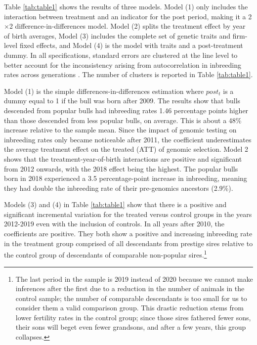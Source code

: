 \documentclass[12pt,letterpaper]{article}
\begin{document}


Table \ref{tab:table1} shows the results of three models.  Model (1) only includes the interaction between treatment and an indicator for the post period, making it a 2$\times$2 difference-in-differences model. Model (2) splits the treatment effect by year of birth averages, Model (3) includes the complete set of genetic traits and firm-level fixed effects, and Model (4) is the model with traits and a post-treatment dummy. In all specifications, standard errors are clustered at the line level to better account for the inconsistency arising from autocorrelation in inbreeding rates across generations \citep{Bertrand2004}. The number of clusters is reported in Table \ref{tab:table1}. 

Model (1) is the simple differences-in-differences estimation where $post_{t}$ is a dummy equal to 1 if the bull was born after 2009. The results show that bulls descended from popular bulls had inbreeding rates 1.46 percentage points higher than those descended from less popular bulls, on average. This is about a 48\% increase relative to the sample mean. Since the impact of genomic testing on inbreeding rates only became noticeable after 2011, the coefficient underestimates the average treatment effect on the treated (ATT) of genomic selection. Model 2 shows that the treatment-year-of-birth interactions are positive and significant from 2012 onwards, with the 2018 effect being the highest.
The popular bulls born in 2018 experienced a 3.5 percentage-point increase in inbreeding, meaning they had double the inbreeding rate of their pre-genomics ancestors (2.9\%).

Models (3) and (4) in Table \ref{tab:table1} show that there is a positive and significant incremental variation for the treated versus control groups in the years 2012-2019 even with the inclusion of controls. In all years after 2010, the coefficients are positive. They both show a positive and increasing inbreeding rate in the treatment group comprised of all descendants from prestige sires relative to the control group of descendants of comparable non-popular sires.\footnote{The last period in the sample is 2019 instead of 2020 because we cannot make inferences after the first due to a reduction in the number of animals in the control sample; the number of comparable descendants is too small for us to consider them a valid comparison group. This drastic reduction stems from lower fertility rates in the control group; since those sires fathered fewer sons, their sons will beget even fewer grandsons, and after a few years, this group collapses.} 
\end{document}
